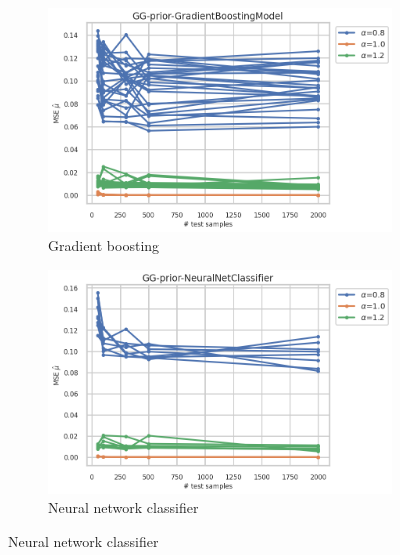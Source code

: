 \begin{figure}[ht!]
  \centering
  \begin{subfigure}[t]{0.49\linewidth}
    \includegraphics[width=\linewidth]{COMPARE/GG-prior/GradientBoostingModel/profusion_n_samples_mse.png}
    \caption{Gradient boosting}
  \end{subfigure}%
  \hfill
  \begin{subfigure}[t]{0.49\linewidth}
    \includegraphics[width=\linewidth]{COMPARE/GG-prior/NeuralNetClassifier/profusion_n_samples_mse.png}
    \caption{Neural network classifier}
  \end{subfigure}


\end{figure}

